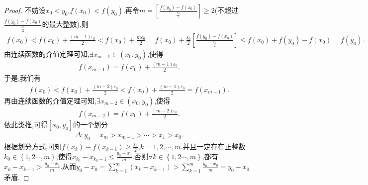 \documentclass[lang=cn,newtx,10pt,scheme=chinese]{../Template/elegantbook}
\begin{document}
\begin{proof}
        不妨设\(x_0<y_0\),\(f\left( x_0 \right) <f\left( y_0 \right)\).再令\(m=\left[ \frac{f\left( y_0 \right) -f\left( x_0 \right)}{\frac{\varepsilon _0}{2}} \right] \geq 2\)(不超过\(\frac{f\left( y_0 \right) -f\left( x_0 \right)}{\frac{\varepsilon _0}{2}}\)的最大整数),则
        \begin{align*}
            f\left( x_0 \right) <f\left( x_0 \right) +\frac{\left( m - 1 \right) \varepsilon _0}{2}<f\left( x_0 \right) +\frac{m\varepsilon _0}{2}=f\left( x_0 \right) +\frac{\varepsilon _0}{2}\left[ \frac{f\left( y_0 \right) -f\left( x_0 \right)}{\frac{\varepsilon _0}{2}} \right] \leqslant f\left( x_0 \right) +f\left( y_0 \right) -f\left( x_0 \right) =f\left( y_0 \right).
        \end{align*}
        由连续函数的介值定理可知,\(\exists x_{m - 1}\in \left( x_0,y_0 \right)\),使得
        \begin{align*}
           f\left( x_{m - 1} \right) =f\left( x_0 \right) +\frac{\left( m - 1 \right) \varepsilon _0}{2}.
        \end{align*}
        于是,我们有
        \begin{align*}
            f\left( x_0 \right) <f\left( x_0 \right) +\frac{\left( m - 2 \right) \varepsilon _0}{2}<f\left( x_0 \right) +\frac{\left( m - 1 \right) \varepsilon _0}{2}=f\left( x_{m - 1} \right).
        \end{align*}
        再由连续函数的介值定理可知,\(\exists x_{m - 2}\in \left( x_0,y_0 \right)\),使得
        \begin{align*}
            f\left( x_{m - 2} \right) =f\left( x_0 \right) +\frac{\left( m - 2 \right) \varepsilon _0}{2}.
        \end{align*}
        依此类推,可得\(\left[ x_0,y_0 \right]\)的一个划分
        \begin{align*}
            \Delta :y_0=x_m>x_{m - 1}>\cdots >x_1>x_0.
        \end{align*}
        根据划分方式,可知\(f\left( x_k \right) -f\left( x_{k - 1} \right) \geq \frac{\varepsilon _0}{2}\),\(k = 1,2,\cdots,m\).并且一定存在正整数\(k_0\in \left\{ 1,2\cdots,m \right\}\),使得\(x_{k_0}-x_{k_0 - 1}\leq \frac{y_0 - x_0}{m}\).否则\(\forall k\in \left\{ 1,2\cdots,m \right\}\),都有\(x_k - x_{k - 1}>\frac{y_0 - x_0}{m}\).从而\(y_0 - x_0=\sum_{k = 1}^m{\left( x_k - x_{k - 1} \right)}>\sum_{k = 1}^m{\frac{y_0 - x_0}{m}} = y_0 - x_0\)矛盾.
        

\end{proof}
\end{document}
